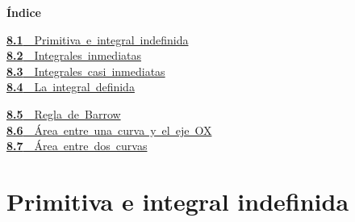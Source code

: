 \documentclass[11pt,a4paper]{article}
\begin{document}
\begin{tcolorbox}[colback=fmsurface,colframe=fmsurface,arc=3mm,left=4mm,right=4mm,top=2mm,bottom=2mm]
\small\textbf{Índice}\par\smallskip
\begin{minipage}[t]{0.49\linewidth}\small \mbox{\hyperlink{sec1}{\textbf{\color{fmgreen}8.1}\ \ Primitiva e integral indefinida}}\\[3pt]
\mbox{\hyperlink{sec2}{\textbf{\color{fmgreen}8.2}\ \ Integrales inmediatas}}\\[3pt]
\mbox{\hyperlink{sec3}{\textbf{\color{fmgreen}8.3}\ \ Integrales casi inmediatas}}\\[3pt]
\mbox{\hyperlink{sec4}{\textbf{\color{fmgreen}8.4}\ \ La integral definida}}\\[3pt]\end{minipage}\hfill\begin{minipage}[t]{0.49\linewidth}\small \mbox{\hyperlink{sec5}{\textbf{\color{fmgreen}8.5}\ \ Regla de Barrow}}\\[3pt]
\mbox{\hyperlink{sec6}{\textbf{\color{fmgreen}8.6}\ \ Área entre una curva y el eje OX}}\\[3pt]
\mbox{\hyperlink{sec7}{\textbf{\color{fmgreen}8.7}\ \ Área entre dos curvas}}\\[3pt]\end{minipage}
\end{tcolorbox}

\section{Primitiva e integral indefinida}\hypertarget{sec1}{}

  
\end{document}
